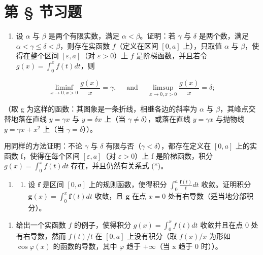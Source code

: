 \setcounter{exercisegroup}{1}
\section*{第 \S{} 节习题}
{}

\begin{enumerate}
\def\labelenumi{\arabic{enumi})}
\tightlist
\item
  设 \(\alpha\) 与 \(\beta\) 是两个有限实数，满足 \(\alpha < \beta\)。证明：若 \(\gamma\) 与 \(\delta\) 是两个数，满足 \(\alpha < \gamma \leqslant \delta < \beta\)，则存在实函数 \(f\)（定义在区间 \([0, a]\) 上），只取值 \(\alpha\) 与 \(\beta\)，使得在整个区间 \([\varepsilon, a]\)（对 \(\varepsilon > 0\)）上 \(f\) 是阶梯函数，并且若令 \(g(x) = \int_0^x f(t)dt\)，则
\end{enumerate}

\[
\liminf _ {x \to 0,   x > 0} \frac {g (x)}{x} = \gamma , \quad \text { and } \quad \limsup _ {x \to 0,   x > 0} \frac {g (x)}{x} = \delta ;\tag{*}
\]

（取 g 为这样的函数：其图象是一条折线，相继各边的斜率为 \(\alpha\) 与 \(\beta\)，其峰点交替地落在直线 \(y = \gamma x\) 与 \(y = \delta x\) 上（当 \(\gamma \neq \delta\)），或落在直线 \(y = \gamma x\) 与抛物线 \(y = \gamma x + x^{2}\) 上（当 \(\gamma = \delta\)））。

用同样的方法证明：不论 \(\gamma\) 与 \(\delta\) 有限与否（\(\gamma < \delta\)），都存在定义在 \([0, a]\) 上的实函数 f，使得在每个区间 \([\varepsilon, a]\)（对 \(\varepsilon > 0\)）上 f 是阶梯函数，积分 \(g(x) = \int_{0}^{x} f(t) dt\) 存在，并且仍然有关系式 (*)。

\begin{enumerate}
\def\labelenumi{\arabic{enumi})}
\setcounter{enumi}{1}
\tightlist
\item
  \begin{enumerate}
  \def\labelenumii{\alph{enumii})}
  \tightlist
  \item
    设 \(\mathbf{f}\) 是区间 \([0, a]\) 上的规则函数，使得积分 \(\int_0^a \frac{\mathbf{f}(t)}{t} dt\) 收敛。证明积分 \(\mathbf{g}(x) = \int_0^x \mathbf{f}(t) dt\) 收敛，且 \(\mathbf{g}\) 在点 \(x = 0\) 处有右导数（适当地分部积分）。
  \end{enumerate}
\end{enumerate}

\begin{enumerate}
\def\labelenumi{\alph{enumi})}
\setcounter{enumi}{1}
\tightlist
\item
  给出一个实函数 \(f\) 的例子，使得积分 \(g(x) = \int_0^x f(t)dt\) 收敛并且在点 0 处有右导数，然而 \(f(t) / t\) 在 \([0, a]\) 上没有积分（取 \(f(x)/x\) 为形如 \(\cos\varphi(x)\) 的函数的导数，其中 \(\varphi\) 趋于 \(+\infty\)（当 x 趋于 0 时））。
\end{enumerate}

